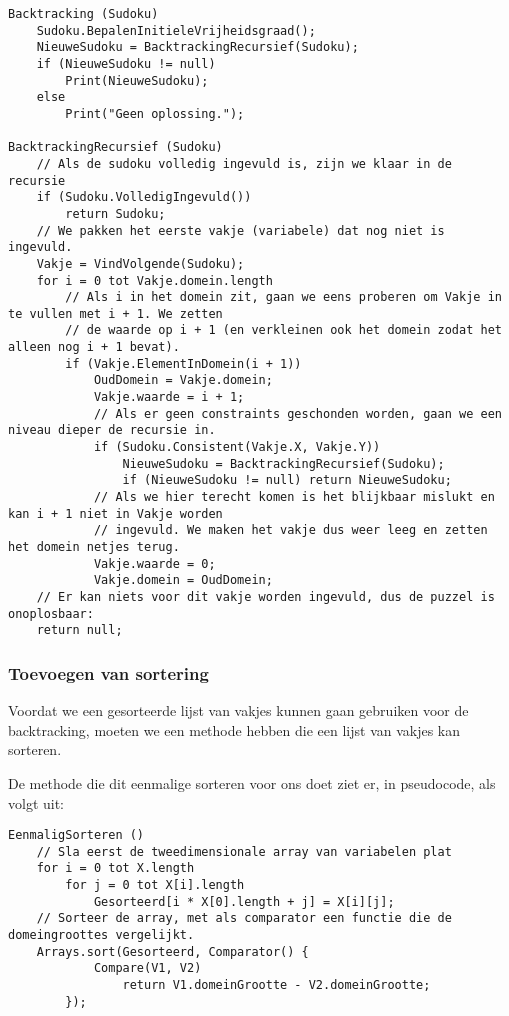 \documentclass[]{report}
\begin{document}
\begin{minipage}{\textwidth}
\begin{lstlisting}
Backtracking (Sudoku)
	Sudoku.BepalenInitieleVrijheidsgraad();
	NieuweSudoku = BacktrackingRecursief(Sudoku);
	if (NieuweSudoku != null)
		Print(NieuweSudoku);
	else
		Print("Geen oplossing.");

BacktrackingRecursief (Sudoku)
	// Als de sudoku volledig ingevuld is, zijn we klaar in de recursie
	if (Sudoku.VolledigIngevuld())
		return Sudoku;
	// We pakken het eerste vakje (variabele) dat nog niet is ingevuld.	
	Vakje = VindVolgende(Sudoku);
	for i = 0 tot Vakje.domein.length
		// Als i in het domein zit, gaan we eens proberen om Vakje in te vullen met i + 1. We zetten 
		// de waarde op i + 1 (en verkleinen ook het domein zodat het alleen nog i + 1 bevat).
		if (Vakje.ElementInDomein(i + 1))
			OudDomein = Vakje.domein;
			Vakje.waarde = i + 1;
			// Als er geen constraints geschonden worden, gaan we een niveau dieper de recursie in.
			if (Sudoku.Consistent(Vakje.X, Vakje.Y))
				NieuweSudoku = BacktrackingRecursief(Sudoku);
				if (NieuweSudoku != null) return NieuweSudoku;
			// Als we hier terecht komen is het blijkbaar mislukt en kan i + 1 niet in Vakje worden 
			// ingevuld. We maken het vakje dus weer leeg en zetten het domein netjes terug. 
			Vakje.waarde = 0;
			Vakje.domein = OudDomein;
	// Er kan niets voor dit vakje worden ingevuld, dus de puzzel is onoplosbaar:
	return null;
\end{lstlisting}
\end{minipage}

\subsubsection{Toevoegen van sortering}
Voordat we een gesorteerde lijst van vakjes kunnen gaan gebruiken voor de backtracking, moeten we een methode hebben die een lijst van vakjes kan sorteren.

De methode die dit eenmalige sorteren voor ons doet ziet er, in pseudocode, als volgt uit:

\begin{minipage}{\textwidth}
\begin{lstlisting}
EenmaligSorteren ()
	// Sla eerst de tweedimensionale array van variabelen plat
	for i = 0 tot X.length
		for j = 0 tot X[i].length
			Gesorteerd[i * X[0].length + j] = X[i][j];
	// Sorteer de array, met als comparator een functie die de domeingroottes vergelijkt.
	Arrays.sort(Gesorteerd, Comparator() {
	        Compare(V1, V2)
	            return V1.domeinGrootte - V2.domeinGrootte;
	    });
\end{lstlisting}
\end{minipage}
\end{document}
